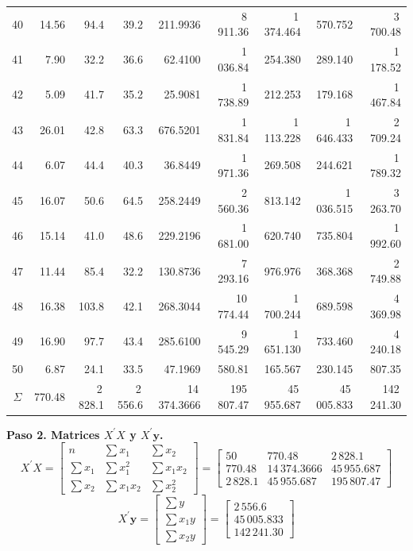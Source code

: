 \documentclass[12pt,letterpaper]{article}
\begin{document}
{\begin{longtable}{|c||r|r|r||r|r|r|r|r|}
40 & 14.56 & 94.4 & 39.2 & 211.9936 & 8\,911.36 & 1\,374.464 & 570.752 & 3\,700.48 \\
41 & 7.90 & 32.2 & 36.6 & 62.4100 & 1\,036.84 & 254.380 & 289.140 & 1\,178.52 \\
42 & 5.09 & 41.7 & 35.2 & 25.9081 & 1\,738.89 & 212.253 & 179.168 & 1\,467.84 \\
43 & 26.01 & 42.8 & 63.3 & 676.5201 & 1\,831.84 & 1\,113.228 & 1\,646.433 & 2\,709.24 \\
44 & 6.07 & 44.4 & 40.3 & 36.8449 & 1\,971.36 & 269.508 & 244.621 & 1\,789.32 \\
45 & 16.07 & 50.6 & 64.5 & 258.2449 & 2\,560.36 & 813.142 & 1\,036.515 & 3\,263.70 \\
46 & 15.14 & 41.0 & 48.6 & 229.2196 & 1\,681.00 & 620.740 & 735.804 & 1\,992.60 \\
47 & 11.44 & 85.4 & 32.2 & 130.8736 & 7\,293.16 & 976.976 & 368.368 & 2\,749.88 \\
48 & 16.38 & 103.8 & 42.1 & 268.3044 & 10\,774.44 & 1\,700.244 & 689.598 & 4\,369.98 \\
49 & 16.90 & 97.7 & 43.4 & 285.6100 & 9\,545.29 & 1\,651.130 & 733.460 & 4\,240.18 \\
50 & 6.87 & 24.1 & 33.5 & 47.1969 & 580.81 & 165.567 & 230.145 & 807.35 \\
\hline\hline
$\Sigma$ & 770.48 & 2\,828.1 & 2\,556.6 & 14\,374.3666 & 195\,807.47 & 45\,955.687 & 45\,005.833 & 142\,241.30 \\
\end{longtable}
}

\textbf{Paso 2. Matrices $X^{\prime}X$ y $X^{\prime}\mathbf{y}$.}
$$ X^{\prime}X = \begin{bmatrix} n & \sum x_1 & \sum x_2 \\ \sum x_1 & \sum x_1^2 & \sum x_1 x_2 \\ \sum x_2 & \sum x_1 x_2 & \sum x_2^2 \end{bmatrix}
 = \begin{bmatrix} 50 & 770.48 & 2\,828.1 \\ 770.48 & 14\,374.3666 & 45\,955.687 \\ 2\,828.1 & 45\,955.687 & 195\,807.47 \end{bmatrix} $$
$$ X^{\prime}\mathbf{y} = \begin{bmatrix} \sum y \\ \sum x_1 y \\ \sum x_2 y \end{bmatrix} = \begin{bmatrix} 2\,556.6 \\ 45\,005.833 \\ 142\,241.30 \end{bmatrix} $$
\end{document}
